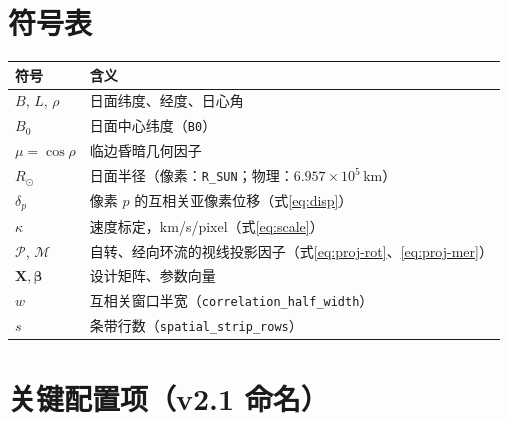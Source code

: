 \documentclass[11pt,a4paper]{ctexart}
\newcommand{\code}[1]{\texttt{\small #1}}
\newcommand{\Rsun}{R_{\odot}}
\newcommand{\Proj}{\mathcal{P}}
\newcommand{\Merid}{\mathcal{M}}
\begin{document}
\appendix
\section{符号表}

\begin{longtable}{@{}ll@{}}
\toprule
符号 & 含义 \\
\midrule
\endhead
$B$, $L$, $\rho$ & 日面纬度、经度、日心角 \\
$B_0$            & 日面中心纬度（\code{B0}） \\
$\mu=\cos\rho$   & 临边昏暗几何因子 \\
$\Rsun$          & 日面半径（像素：\code{R\_SUN}；物理：$6.957\times10^5$\,km） \\
$\delta_p$       & 像素 $p$ 的互相关亚像素位移（式\eqref{eq:disp}） \\
$\kappa$         & 速度标定，km/s/pixel（式\eqref{eq:scale}） \\
$\Proj$, $\Merid$ & 自转、经向环流的视线投影因子（式\eqref{eq:proj-rot}、\eqref{eq:proj-mer}） \\
$\bm{X},\bm\beta$ & 设计矩阵、参数向量 \\
$w$              & 互相关窗口半宽（\code{correlation\_half\_width}） \\
$s$              & 条带行数（\code{spatial\_strip\_rows}） \\
\bottomrule
\end{longtable}

\section{关键配置项（v2.1 命名）}
\end{document}
